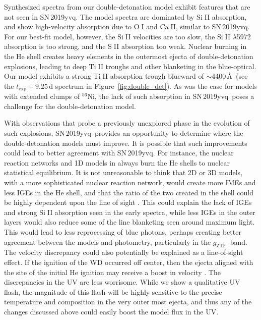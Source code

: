 \documentclass[twocolumn]{aastex63}
\def\ion#1#2{#1$\;${\footnotesize\rm{#2}}\relax}
\newcommand{\gztf}{$g_\mathrm{ZTF}$}
\newcommand{\radni}{$^{56}$Ni}
\newcommand{\sn}{SN\,2019yvq}
\begin{document}
Synthesized spectra from our double-detonation model exhibit features that are
not seen in \sn. The model spectra are dominated by \ion{Si}{II} absorption,
and show high-velocity absorption due to \ion{O}{I} and \ion{Ca}{II}, similar
to \sn. For our best-fit model, however, the \ion{Si}{II} velocities are too
slow, the \ion{Si}{II} $\lambda$5972 absorption is too strong, and the
\ion{S}{II} absorption too weak. Nuclear burning in the He shell creates heavy
elements in the outermost ejecta of double-detonation explosions, leading to
deep \ion{Ti}{II} troughs and other blanketing in the blue-optical. Our model
exhibits a strong \ion{Ti}{II} absorption trough blueward of $\sim$4400\,\AA\
(see the $t_\mathrm{exp} + 9.25$\,d spectrum in Figure~\ref{fig:double_det}).
As was the case for models with extended clumps of \radni, the lack of such
absorption in \sn\ poses a challenge for the double-detonation model.

With observations that probe a previously unexplored phase in the evolution of
such explosions, \sn\ provides an opportunity to determine where the
double-detonation models must improve. It is possible that such improvements
could lead to better agreement with \sn. For instance, the nuclear reaction
networks and 1D models in \citet{Polin19} always burn the He shells to nuclear
statistical equilibrium. It is not unreasonable to think that 2D or 3D models,
with a more sophisticated nuclear reaction network, would create more IMEs and
less IGEs in the He shell, and that the ratio of the two created in the shell
could be highly dependent upon the line of sight \citep[initial work along
these lines is presented in][however, the nuclear yields are only mildly
different from 1D models]{Gronow20}. This could explain the lack of IGEs and
strong \ion{Si}{II} absorption seen in the early spectra, while less IGEs in
the outer layers would also reduce some of the line blanketing seen around
maximum light. This would lead to less reprocessing of blue photons, perhaps
creating better agreement between the models and photometry, particularly in
the \gztf\ band. The velocity discrepancy could also potentially be explained
as a line-of-sight effect. If the ignition of the WD occurred off center, then
the ejecta aligned with the site of the initial He ignition may receive a
boost in velocity \citep[e.g.,][]{Kromer10}. The discrepancies in the UV are
less worrisome. While we show a qualitative UV flash, the magnitude of this
flash will be highly sensitive to the precise temperature and composition in
the very outer most ejecta, and thus any of the changes discussed above could
easily boost the model flux in the UV.
\end{document}
